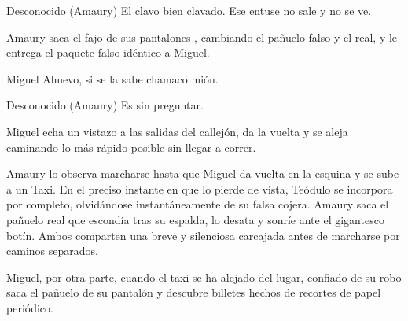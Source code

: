 \begin{dialogue}{Desconocido (Amaury)}
El clavo bien clavado. Ese entuse no sale y no se ve.
\end{dialogue}

\begin{scenedesc}
Amaury saca el fajo de sus pantalones , cambiando el pañuelo falso y el real,  y le entrega el paquete falso idéntico a Miguel.
\end{scenedesc}

\begin{dialogue}{Miguel}
Ahuevo, si se la sabe chamaco mión.
\end{dialogue}

\begin{dialogue}{Desconocido (Amaury)}
Es sin preguntar. 
\end{dialogue}

\begin{scenedesc}
Miguel echa un vistazo a las salidas del callejón, da la vuelta y se aleja caminando lo más rápido posible sin llegar a correr. \linebreak

Amaury lo observa marcharse hasta que Miguel da vuelta en la esquina y se sube a un Taxi. En el preciso instante en que lo pierde de vista, Teódulo se incorpora por completo, olvidándose instantáneamente de su falsa cojera. Amaury saca el pañuelo real que escondía tras su espalda, lo desata y sonríe ante el gigantesco botín. Ambos comparten una breve y silenciosa carcajada antes de marcharse por caminos separados. \linebreak

Miguel, por otra parte, cuando el taxi se ha alejado del lugar, confiado de su robo saca el pañuelo de su pantalón y descubre billetes hechos de recortes de papel periódico. \\
\end{scenedesc}

